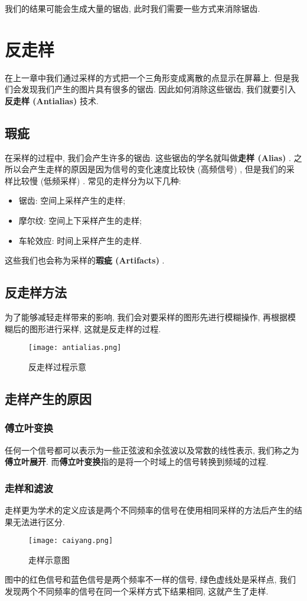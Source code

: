 我们的结果可能会生成大量的锯齿, 此时我们需要一些方式来消除锯齿. 

\chapter{反走样}
在上一章中我们通过采样的方式把一个三角形变成离散的点显示在屏幕上. 但是我们会发现我们产生的图片具有很多的锯齿. 因此如何消除这些锯齿, 我们就要引入\textbf{反走样 (Antialias) }技术. 

\section{瑕疵}
在采样的过程中, 我们会产生许多的锯齿. 这些锯齿的学名就叫做\textbf{走样 (Alias) }. 之所以会产生走样的原因是因为信号的变化速度比较快 (高频信号) , 但是我们的采样比较慢 (低频采样) . 常见的走样分为以下几种: 
\begin{itemize}
	\item 锯齿: 空间上采样产生的走样; 
	\item 摩尔纹: 空间上下采样产生的走样; 
	\item 车轮效应: 时间上采样产生的走样. 
\end{itemize}
这些我们也会称为采样的\textbf{瑕疵 (Artifacts) }. 

\section{反走样方法}
为了能够减轻走样带来的影响, 我们会对要采样的图形先进行模糊操作, 再根据模糊后的图形进行采样, 这就是反走样的过程. 
\begin{figure}[H]
	\centering
	\texttt{[image: antialias.png]}
	\caption{反走样过程示意}
	\label{fig:antialias}
\end{figure}

\section{走样产生的原因}
\subsection{傅立叶变换}
任何一个信号都可以表示为一些正弦波和余弦波以及常数的线性表示, 我们称之为\textbf{傅立叶展开}. 而\textbf{傅立叶变换}指的是将一个时域上的信号转换到频域的过程. 
\subsection{走样和滤波}
走样更为学术的定义应该是两个不同频率的信号在使用相同采样的方法后产生的结果无法进行区分. 
\begin{figure}[H]
	\centering
	\texttt{[image: caiyang.png]}
	\caption{走样示意图}
	\label{fig:alias}
\end{figure}
图中的红色信号和蓝色信号是两个频率不一样的信号, 绿色虚线处是采样点, 我们发现两个不同频率的信号在同一个采样方式下结果相同, 这就产生了走样. 

